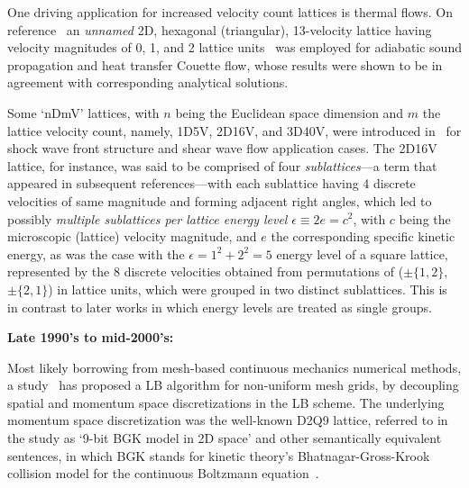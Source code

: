     One    driving    application     for     increased     velocity     count     lattices     is     thermal     flows.     On
    reference~\cite{1993-AlexanderFJ+SterlingJD-PhysRevE} an \emph{unnamed}  2D,  hexagonal  (triangular),  13-velocity  lattice
    having velocity magnitudes of 0,  1,  and  2  lattice  units~\cite{1998-ChenS+DoolenGD-AnnuRevFluidMech}  was  employed  for
    adiabatic sound propagation and heat transfer Couette flow, whose results were shown to be in agreement  with  corresponding
    analytical solutions.

    Some `nDmV' lattices, with $n$ being the Euclidean space dimension and $m$ the lattice velocity count, namely, 1D5V,  2D16V,
    and 3D40V, were introduced in~\cite{1994-ChenY+AkiyamaM-PhysRevE} for  shock  wave  front  structure  and  shear  wave  flow
    application cases. The 2D16V lattice, for instance, was said to  be  comprised  of  four  \emph{sublattices}---a  term  that
    appeared in subsequent references---with each sublattice having 4 discrete velocities of same magnitude and forming adjacent
    right angles, which led to possibly \emph{multiple sublattices per lattice energy level} $\epsilon \equiv 2e  =  c^2$,  with
    $c$ being the microscopic (lattice) velocity magnitude, and $e$ the corresponding specific kinetic energy, as was  the  case
    with the $\epsilon = 1^2 + 2^2 = 5$ energy level of a square lattice, represented by the 8 discrete velocities obtained from
    permutations of ($\pm\{1,2\}$, $\pm\{2,1\}$) in lattice units, which were grouped in two distinct sublattices.  This  is  in
    contrast to later works in which energy levels are treated as single groups.


    \vspace{2.0mm}\noindent\textbf{Late 1990's to mid-2000's:}\vspace{1.0mm}

    Most likely borrowing from mesh-based continuous mechanics numerical methods, a study~\cite{1996-HeX+DemboM-JComputPhys} has
    proposed a LB algorithm for non-uniform mesh grids, by decoupling spatial and  momentum  space  discretizations  in  the  LB
    scheme. The underlying momentum space discretization was the well-known D2Q9 lattice, referred to in the study as `9-bit BGK
    model  in  2D  space'  and  other  semantically  equivalent  sentences,  in  which   BGK   stands   for   kinetic   theory's
    Bhatnagar-Gross-Krook  collision  model  for  the   continuous   Boltzmann   equation~\cite{1954-BhatnagarPL+KrookM-PhysRev,
    2003-LiboffRL-bookSpringer, 2011-HarrisS-Dover}.

